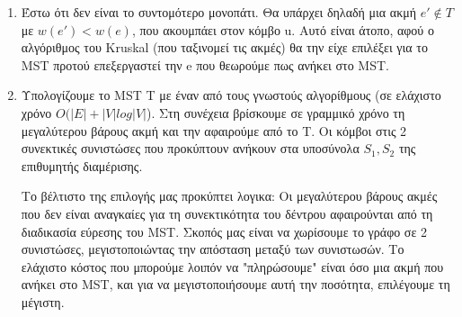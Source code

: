 \documentclass[a4paper,11pt]{article}
\begin{document}
\begin{enumerate}
\item Έστω ότι δεν είναι το συντομότερο μονοπάτι. Θα υπάρχει δηλαδή μια ακμή
$e' \notin T$ με $w(e') < w(e)$, που ακουμπάει στον κόμβο u. Αυτό είναι άτοπο,
αφού ο αλγόριθμος του Kruskal (που ταξινομεί τις ακμές) θα την είχε επιλέξει
για το MST προτού επεξεργαστεί την e που θεωρούμε πως ανήκει στο MST.
\item Υπολογίζουμε το MST T με έναν από τους γνωστούς αλγορίθμους (σε ελάχιστο
χρόνο $O(|E| + |V|log|V|$). Στη συνέχεια βρίσκουμε σε γραμμικό χρόνο τη
μεγαλύτερου βάρους ακμή και την αφαιρούμε από το T. Οι κόμβοι στις 2
συνεκτικές συνιστώσες που προκύπτουν ανήκουν στα υποσύνολα $S_1, S_2$ της
επιθυμητής διαμέρισης.

Το βέλτιστο της επιλογής μας προκύπτει λογικα: Οι μεγαλύτερου βάρους ακμές που
δεν είναι αναγκαίες για τη συνεκτικότητα του δέντρου αφαιρούνται από τη
διαδικασία εύρεσης του MST. Σκοπός μας είναι να χωρίσουμε το γράφο σε 2
συνιστώσες, μεγιστοποιώντας την απόσταση μεταξύ των συνιστωσών. Το ελάχιστο
κόστος που μπορούμε λοιπόν να "πληρώσουμε" είναι όσο μια ακμή που ανήκει στο
MST, και για να μεγιστοποιήσουμε αυτή την ποσότητα, επιλέγουμε τη μέγιστη.
\end{enumerate}


\end{document}
